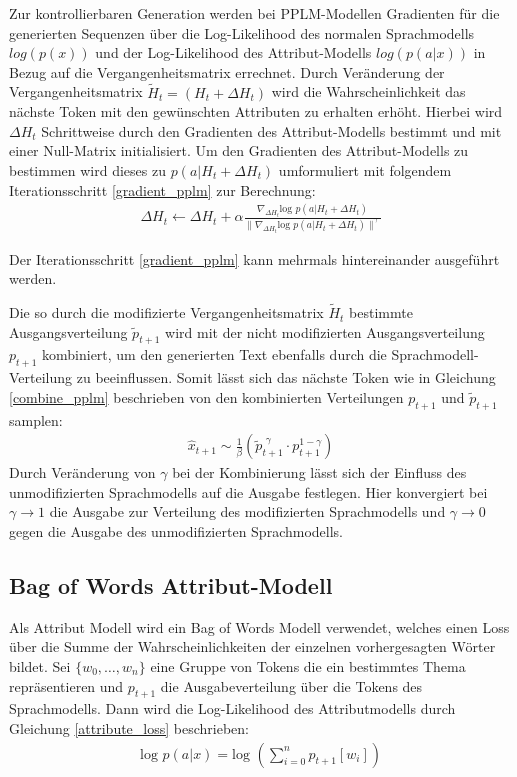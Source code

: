 Zur kontrollierbaren Generation werden bei PPLM-Modellen Gradienten für die generierten Sequenzen über die Log-Likelihood des normalen Sprachmodells $log(p(x))$ und der Log-Likelihood des Attribut-Modells $log(p(a|x))$ in Bezug auf die Vergangenheitsmatrix errechnet. 
Durch Veränderung der Vergangenheitsmatrix $\tilde{H}_t = (H_t+\Delta H_t)$ wird die Wahrscheinlichkeit das nächste Token mit den gewünschten Attributen zu erhalten erhöht. 
Hierbei wird $\Delta H_t$ Schrittweise durch den Gradienten des Attribut-Modells bestimmt und mit einer Null-Matrix initialisiert.
Um den Gradienten des Attribut-Modells zu bestimmen wird dieses zu $p(a|H_t+\Delta H_t)$ umformuliert mit folgendem Iterationsschritt \ref{gradient_pplm} zur Berechnung:
\begin{align}
    \label{gradient_pplm}
\Delta H_t \leftarrow \Delta H_t + \alpha \frac{\nabla_{\Delta H_t} \text{log }p(a|H_t+\Delta H_t)}{\| \nabla_{\Delta H_t} \text{log }p(a|H_t+\Delta H_t)\|^\gamma}
\end{align}

Der Iterationsschritt \ref{gradient_pplm} kann mehrmals hintereinander ausgeführt werden.

Die so durch die modifizierte Vergangenheitsmatrix $\tilde{H}_t$ bestimmte Ausgangsverteilung $\tilde{p}_{t+1}$ wird mit der nicht modifizierten Ausgangsverteilung $p_{t+1}$ kombiniert, um den generierten Text ebenfalls durch die Sprachmodell-Verteilung zu beeinflussen.
Somit lässt sich das nächste Token wie in Gleichung \ref{combine_pplm} beschrieben von den kombinierten Verteilungen $p_{t+1}$ und $\tilde{p}_{t+1}$ samplen: \begin{align} \label{combine_pplm}\hat{x}_{t+1} \sim \frac{1}{\beta} (\tilde{p}_{t+1}^{\text{ }\gamma} \cdot p_{t+1}^{1-\gamma})\end{align}
Durch Veränderung von $\gamma$ bei der Kombinierung lässt sich der Einfluss des unmodifizierten Sprachmodells auf die Ausgabe festlegen. Hier konvergiert bei $\gamma \rightarrow 1$ die Ausgabe zur Verteilung des modifizierten Sprachmodells und $\gamma \rightarrow 0$ gegen die Ausgabe des unmodifizierten Sprachmodells.




\subsection{Bag of Words Attribut-Modell}
Als Attribut Modell wird ein Bag of Words Modell verwendet, welches einen Loss über die Summe der Wahrscheinlichkeiten der einzelnen vorhergesagten Wörter bildet.
Sei $\{w_0, \ldots, w_n\}$ eine Gruppe von Tokens die ein bestimmtes Thema repräsentieren und $p_{t+1}$ die Ausgabeverteilung über die Tokens des Sprachmodells.
Dann wird die Log-Likelihood des Attributmodells durch Gleichung \ref{attribute_loss} beschrieben: 
\begin{align}
    \label{attribute_loss}
    \text{log }p(a|x) = \text{log }(\sum_{i=0}^n p_{t+1}[w_i])
\end{align}

